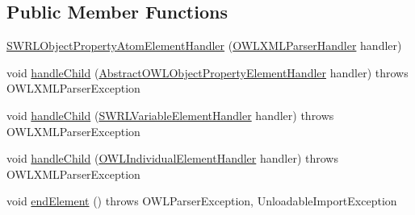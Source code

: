 \subsection*{Public Member Functions}
\begin{DoxyCompactItemize}
\item 
\hyperlink{classorg_1_1coode_1_1owlapi_1_1owlxmlparser_1_1_s_w_r_l_object_property_atom_element_handler_a78feca21dd9b5fa5c97ab6af58bf9e8c}{S\-W\-R\-L\-Object\-Property\-Atom\-Element\-Handler} (\hyperlink{classorg_1_1coode_1_1owlapi_1_1owlxmlparser_1_1_o_w_l_x_m_l_parser_handler}{O\-W\-L\-X\-M\-L\-Parser\-Handler} handler)
\item 
void \hyperlink{classorg_1_1coode_1_1owlapi_1_1owlxmlparser_1_1_s_w_r_l_object_property_atom_element_handler_a77a328be130b561163b8dce9af60125a}{handle\-Child} (\hyperlink{classorg_1_1coode_1_1owlapi_1_1owlxmlparser_1_1_abstract_o_w_l_object_property_element_handler}{Abstract\-O\-W\-L\-Object\-Property\-Element\-Handler} handler)  throws O\-W\-L\-X\-M\-L\-Parser\-Exception 
\item 
void \hyperlink{classorg_1_1coode_1_1owlapi_1_1owlxmlparser_1_1_s_w_r_l_object_property_atom_element_handler_a26ffd67436a0a549e1821f9c19f7f204}{handle\-Child} (\hyperlink{classorg_1_1coode_1_1owlapi_1_1owlxmlparser_1_1_s_w_r_l_variable_element_handler}{S\-W\-R\-L\-Variable\-Element\-Handler} handler)  throws O\-W\-L\-X\-M\-L\-Parser\-Exception 
\item 
void \hyperlink{classorg_1_1coode_1_1owlapi_1_1owlxmlparser_1_1_s_w_r_l_object_property_atom_element_handler_ac07742281a24322befe09042cc937fff}{handle\-Child} (\hyperlink{classorg_1_1coode_1_1owlapi_1_1owlxmlparser_1_1_o_w_l_individual_element_handler}{O\-W\-L\-Individual\-Element\-Handler} handler)  throws O\-W\-L\-X\-M\-L\-Parser\-Exception 
\item 
void \hyperlink{classorg_1_1coode_1_1owlapi_1_1owlxmlparser_1_1_s_w_r_l_object_property_atom_element_handler_a71aa3031340e3a870bbdfe154f291cbc}{end\-Element} ()  throws O\-W\-L\-Parser\-Exception, Unloadable\-Import\-Exception 
\end{DoxyCompactItemize}
